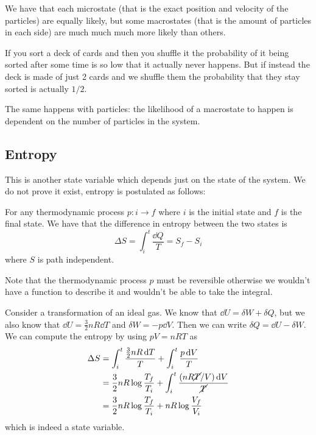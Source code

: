 \documentclass[12pt]{extarticle}
\begin{document}
We have that each microstate (that is the exact position and velocity of the particles) are equally likely, but some macrostates (that is the amount of particles in each side) are much much much more likely than others.

If you sort a deck of cards and then you shuffle it the probability of it being sorted after some time is so low that it actually never happens.
But if instead the deck is made of just 2 cards and we shuffle them the probability that they stay sorted is actually $1/2$.

The same happens with particles:
the likelihood of a macrostate to happen is dependent on the number of particles in the system.

\subsection{Entropy}

This is another state variable which depends just on the state of the system.
We do not prove it exist, entropy is postulated as follows:

\begin{definition}[entropy]
    For any thermodynamic process $p: i \to f$ where $i$ is the initial state and $f$ is the final state. We have that the difference in entropy between the two states is
    \begin{equation}
        \Delta S = \int_i^t \frac{\dd{Q}}{T} = S_f - S_i
    \end{equation}
    where $S$ is path independent.

    Note that the thermodynamic process $p$ must be reversible otherwise we wouldn't have a function to describe it and wouldn't be able to take the integral.
\end{definition}

\begin{example}
    Consider a transformation of an ideal gas.
    We know that $\dd{U} = \delta W + \delta Q$, but we also know that $\dd{U} = \frac{3}{2} n R \dd{T}$ and $\delta W = -p \dd{V}$.
    Then we can write $\delta Q = \dd{U} - \delta W$.
    We can compute the entropy by using $pV = nRT$ as
    \begin{align}
        \Delta S & = \int_i^t \frac{\frac{3}{2} n R \dd{T}}{T} + \int_i^t \frac{p \dd{V}}{T}                   \\
                 & = \frac{3}{2} nR \log \frac{T_f}{T_i} + \int_i^t \frac{(nR\cancel{T}/V) \dd{V}}{\cancel{T}} \\
                 & = \frac{3}{2} nR \log \frac{T_f}{T_i} + nR \log \frac{V_f}{V_i}
    \end{align}
    which is indeed a state variable.
\end{example}
\end{document}
